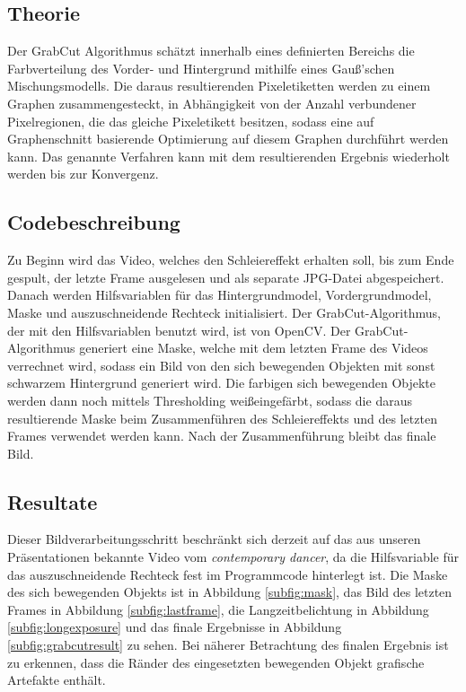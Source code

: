 \documentclass[12pt]{scrartcl}
\begin{document}
\subsection{Theorie}
Der GrabCut Algorithmus sch\"atzt innerhalb eines definierten Bereichs die Farbverteilung des Vorder- und Hintergrund mithilfe eines Gau\ss'schen Mischungsmodells. Die daraus resultierenden Pixeletiketten werden zu einem Graphen zusammengesteckt, in Abh\"angigkeit von der Anzahl verbundener Pixelregionen, die das gleiche Pixeletikett besitzen, sodass eine auf Graphenschnitt basierende Optimierung auf diesem Graphen durchf\"uhrt werden kann. Das genannte Verfahren kann mit dem resultierenden Ergebnis wiederholt werden bis zur Konvergenz. %
\subsection{Codebeschreibung}
Zu Beginn wird das Video, welches den Schleiereffekt erhalten soll, bis zum Ende gespult, der letzte Frame ausgelesen und als separate JPG-Datei abgespeichert. Danach werden Hilfsvariablen f\"ur das Hintergrundmodel, Vordergrundmodel, Maske und auszuschneidende Rechteck initialisiert. Der GrabCut-Algorithmus, der mit den Hilfsvariablen benutzt wird, ist von OpenCV. Der GrabCut-Algorithmus generiert eine Maske, welche mit dem letzten Frame des Videos verrechnet wird, sodass ein Bild von den sich bewegenden Objekten mit sonst schwarzem Hintergrund generiert wird. Die farbigen sich bewegenden Objekte werden dann noch mittels Thresholding wei\ss eingef\"arbt, sodass die daraus resultierende Maske beim Zusammenf\"uhren des Schleiereffekts und des letzten Frames verwendet werden kann. Nach der Zusammenf\"uhrung bleibt das finale Bild.
\subsection{Resultate}
Dieser Bildverarbeitungsschritt beschr\"ankt sich derzeit auf das aus unseren Pr\"asentationen bekannte Video vom \textit{contemporary dancer}, da die Hilfsvariable f\"ur das auszuschneidende Rechteck fest im Programmcode hinterlegt ist. Die Maske des sich bewegenden Objekts ist in Abbildung \ref{subfig:mask}, das Bild des letzten Frames in Abbildung \ref{subfig:lastframe}, die Langzeitbelichtung in Abbildung \ref{subfig:longexposure} und das finale Ergebnisse in Abbildung \ref{subfig:grabcutresult} zu sehen. Bei n\"aherer Betrachtung des finalen Ergebnis ist zu erkennen, dass die R\"ander des eingesetzten bewegenden Objekt grafische Artefakte enth\"alt.
\end{document}

